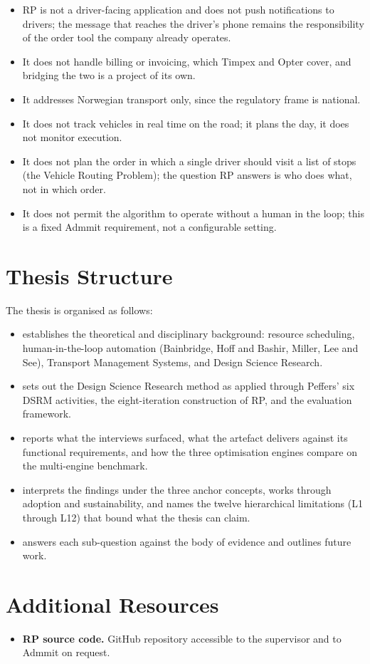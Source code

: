 \begin{itemize}
  \item RP is not a driver-facing application and does not push notifications to drivers; the message that reaches the driver's phone remains the responsibility of the order tool the company already operates.
  \item It does not handle billing or invoicing, which Timpex and Opter cover, and bridging the two is a project of its own.
  \item It addresses Norwegian transport only, since the regulatory frame is national.
  \item It does not track vehicles in real time on the road; it plans the day, it does not monitor execution.
  \item It does not plan the order in which a single driver should visit a list of stops (the Vehicle Routing Problem); the question RP answers is who does what, not in which order.
  \item It does not permit the algorithm to operate without a human in the loop; this is a fixed Admmit requirement, not a configurable setting.
\end{itemize}


\section{Thesis Structure}
\label{sec:thesis-structure}

The thesis is organised as follows:

\begin{itemize}
  \item \textbf{} establishes the theoretical and disciplinary background: resource scheduling, human-in-the-loop automation (Bainbridge, Hoff and Bashir, Miller, Lee and See), Transport Management Systems, and Design Science Research.
  \item \textbf{} sets out the Design Science Research method as applied through Peffers' six DSRM activities, the eight-iteration construction of RP, and the evaluation framework.
  \item \textbf{} reports what the interviews surfaced, what the artefact delivers against its functional requirements, and how the three optimisation engines compare on the multi-engine benchmark.
  \item \textbf{} interprets the findings under the three anchor concepts, works through adoption and sustainability, and names the twelve hierarchical limitations (L1 through L12) that bound what the thesis can claim.
  \item \textbf{} answers each sub-question against the body of evidence and outlines future work.
\end{itemize}


\section{Additional Resources}
\label{sec:additional-resources}


\begin{itemize}
  \item \textbf{RP source code.} GitHub repository accessible to the supervisor and to Admmit on request.
\end{itemize}
